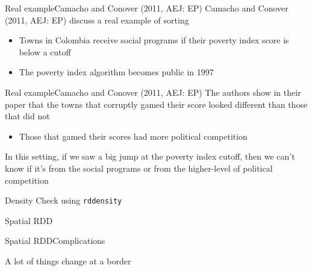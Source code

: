 \documentclass[aspectratio=169,t,11pt,table]{beamer}
\begin{document}
\begin{frame}{Real example}{Camacho and Conover (2011, AEJ: EP)}
  Camacho and Conover (2011, AEJ: EP) discuss a real example of sorting
  \begin{itemize}
    \item Towns in Colombia receive social programs if their poverty index score is below a cutoff
     
    \item The poverty index algorithm becomes public in 1997
  \end{itemize}
\end{frame}


\begin{frame}{Real example}{Camacho and Conover (2011, AEJ: EP)}
  The authors show in their paper that the towns that corruptly gamed their score looked different than those that did not
  \begin{itemize}
    \item Those that gamed their scores had more political competition
  \end{itemize}

  \bigskip
  In this setting, if we saw a big jump at the poverty index cutoff, then we can't know if it's from the social programs or from the higher-level of political competition 
\end{frame}

\begin{frame}[fragile]{Density Check using \texttt{rddensity}}{}
	\begin{codeblock}
	\end{codeblock}
\end{frame}

\begin{frame}{Spatial RDD}{}

\end{frame}

\begin{frame}{Spatial RDD}{Complications}

\end{frame}

\begin{frame}{A lot of things change at a border}{}

\end{frame}
\end{document}
